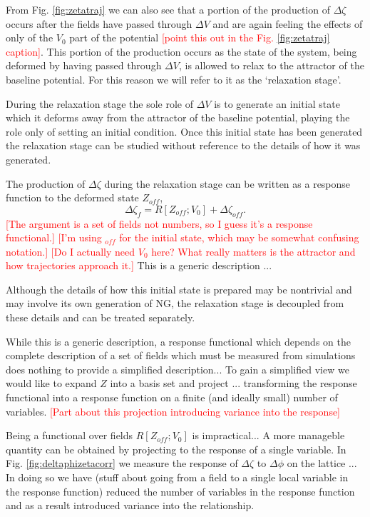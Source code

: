 From Fig. \ref{fig:zetatraj} we can also see that a portion of the production of $\Delta\zeta$ occurs after the fields have passed through $\Delta V$ and are again feeling the effects of only of the $V_0$ part of the potential \textcolor{red}{[point this out in the Fig. \ref{fig:zetatraj} caption]}. This portion of the production occurs as the state of the system, being deformed by having passed through $\Delta V$, is allowed to relax to the attractor of the baseline potential. For this reason we will refer to it as the `relaxation stage'.

During the relaxation stage the sole role of $\Delta V$ is to generate an initial state which it deforms away from the attractor of the baseline potential, playing the role only of setting an initial condition. Once this initial state has been generated the relaxation stage can be studied without reference to the details of how it was generated.

The production of $\Delta\zeta$ during the relaxation stage can be written as a response function to the deformed state $Z_{off}$,
\begin{equation}
  \Delta\zeta_f = R[Z_{off};V_0] + \Delta\zeta_{off}.
\end{equation}
\textcolor{red}{[The argument is a set of fields not numbers, so I guess it's a response functional.]}
\textcolor{red}{[I'm using ${}_{off}$ for the initial state, which may be somewhat confusing notation.]}
\textcolor{red}{[Do I actually need $V_0$ here? What really matters is the attractor and how trajectories approach it.]}
This is a generic description ...

Although the details of how this initial state is prepared may be nontrivial and may involve its own generation of NG, the relaxation stage is decoupled from these details and can be treated separately.

While this is a generic description, a response functional which depends on the complete description of a set of fields which must be measured from simulations does nothing to provide a simplified description... To gain a simplified view we would like to expand $Z$ into a basis set and project ... transforming the response functional into a response function on a finite (and ideally small) number of variables.
\textcolor{red}{[Part about this projection introducing variance into the response]}

Being a functional over fields $R[Z_{off};V_0]$ is impractical... A more manageble quantity can be obtained by projecting to the response of a single variable. In Fig. \ref{fig:deltaphizetacorr} we measure the response of $\Delta\zeta$ to $\Delta\phi$ on the lattice ... In doing so we have (stuff about going from a field to a single local variable in the response function) reduced the number of variables in the response function and as a result introduced variance into the relationship.

